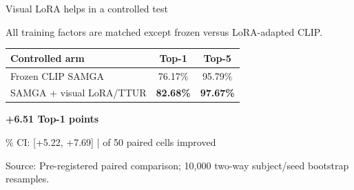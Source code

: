 \documentclass[aspectratio=169,11pt]{beamer}
\newcommand{\sourcefooter}[1]{%
  \vfill
  {\color{Muted}\fontsize{8.5}{10}\selectfont Source: #1\par}
}
\begin{document}
\begin{frame}{Visual LoRA helps in a controlled test}
  \vspace{0.10cm}
  {\fontsize{14}{18}\selectfont
    All training factors are matched except frozen versus LoRA-adapted CLIP.
  \par}
  \vspace{0.18cm}

  \begin{center}
  \renewcommand{\arraystretch}{1.34}
  \begin{tabular}{>{\raggedright\arraybackslash}p{5.7cm}cc}
    \toprule
    \textbf{Controlled arm} & \textbf{Top-1} & \textbf{Top-5}\\
    \midrule
    Frozen CLIP SAMGA & 76.17\% & 95.79\%\\
    SAMGA + visual LoRA/TTUR & \textbf{\color{Teal}82.68\%} & \textbf{\color{Teal}97.67\%}\\
    \bottomrule
  \end{tabular}
  \end{center}

  \vspace{0.18cm}
  \begin{center}
    {\color{Orange}\bfseries\fontsize{22}{26}\selectfont +6.51 Top-1 points\par}
    {\color{Muted}\fontsize{13}{17}\% CI: [+5.22, +7.69] \quad| of 50 paired cells improved
    \par}
  \end{center}
  \sourcefooter{Pre-registered paired comparison; 10,000 two-way subject/seed bootstrap resamples.}
\end{frame}

\end{document}
